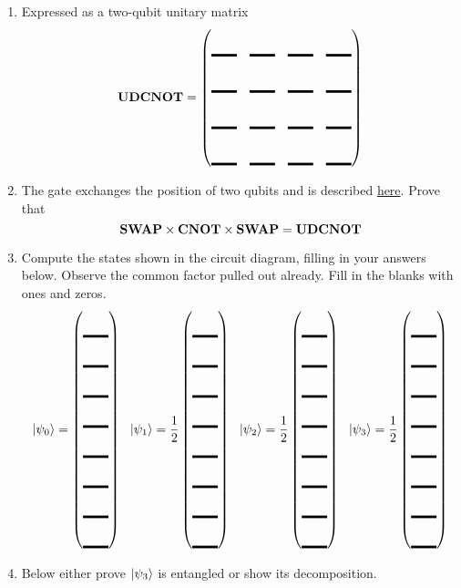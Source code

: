 \documentclass[12pt]{article}
\begin{document}
\begin{enumerate}
\begin{enumerate}[label=\theenumi.\arabic*]
\item Expressed as a two-qubit unitary matrix
\[
\NamedGate{UDCNOT} = \begin{pmatrix*}[r]
\Blank[2em]{} & \Blank[2em]{} & \Blank[2em]{} & \Blank[2em]{}\\[0.5em]
\Blank[2em]{} & \Blank[2em]{} & \Blank[2em]{} & \Blank[2em]{}\\[0.5em]
\Blank[2em]{} & \Blank[2em]{} & \Blank[2em]{} & \Blank[2em]{}\\[0.5em]
\Blank[2em]{} & \Blank[2em]{} & \Blank[2em]{} & \Blank[2em]{}
\end{pmatrix*}
\]
\item The  gate exchanges the position of two qubits and is described \href{https://docs.quantum.ibm.com/api/qiskit/qiskit.circuit.library.SwapGate}{here}. Prove that 
\[
\mbox{\bfseries{\textrm{SWAP}}} \times \mbox{\bfseries{\textrm{CNOT}}} \times \mbox{\bfseries{\textrm{SWAP}}} = \mbox{\bfseries{\textrm{UDCNOT}}}
\]
\LeaveSpace{}
\item Compute the states shown in the circuit diagram, filling in your answers below. Observe the common factor pulled out already.  Fill in the blanks with ones and zeros.
\def\FS#1#2{%
\QState{#1} = #2\begin{pmatrix*}[r]
\Blank[2em]{} \\
\Blank[2em]{} \\
\Blank[2em]{} \\
\Blank[2em]{} \\
\Blank[2em]{} \\
\Blank[2em]{} \\
\Blank[2em]{} \\
\Blank[2em]{}
\end{pmatrix*}%
}
\[ \FS{0}{\relax}\ \ 
\FS{1}{\frac{1}{2}}\ \ 
\FS{2}{\frac{1}{2}}\ \ 
\FS{3}{\frac{1}{2}} \]

\item Below either prove $\ket{\psi_{3}}$ is entangled or show its decomposition.
\LeaveSpace{|}
\end{enumerate}


\end{enumerate}
\end{document}
